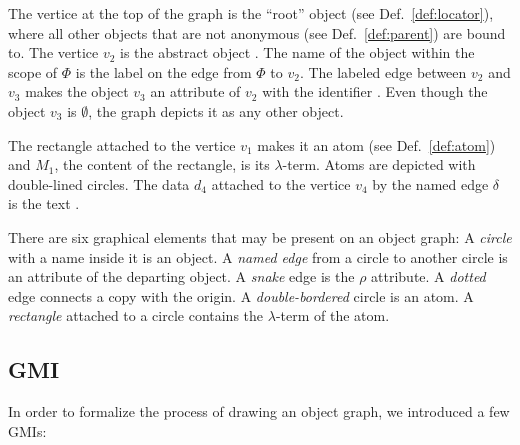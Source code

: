 The vertice at the top of the graph is the ``root'' object (see Def.~\ref{def:locator}),
where all other objects that are not anonymous (see Def.~\ref{def:parent}) are bound to.
The vertice $v_2$ is the abstract object . The name of the object within the
scope of $\Phi$ is the label on the edge from $\Phi$ to $v_2$. The labeled edge
between $v_2$ and $v_3$ makes the object $v_3$ an attribute of $v_2$ with the
identifier . Even though the object $v_3$ is $\emptyset$, the graph
depicts it as any other object.

The rectangle attached to the vertice $v_1$ makes it an atom (see Def.~\ref{def:atom})
and $M_1$, the content of the rectangle, is its $\lambda$-term. Atoms
are depicted with double-lined circles. The data $d_4$
attached to the vertice $v_4$ by the named edge $\delta$
is the text .

There are six graphical elements that may be present on an object graph:
A \emph{circle} with a name inside it is an object.
A \emph{named edge} from a circle to another circle is an attribute of the departing object.
A \emph{snake} edge is the $\rho$ attribute.
A \emph{dotted} edge connects a copy with the origin.
A \emph{double-bordered} circle is an atom.
A \emph{rectangle} attached to a circle contains the $\lambda$-term of the atom.

\subsection{GMI}

In order to formalize the process of drawing an object graph,
we introduced a few GMIs:

